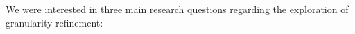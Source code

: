 We were interested in three main research questions regarding the exploration of granularity refinement: 

